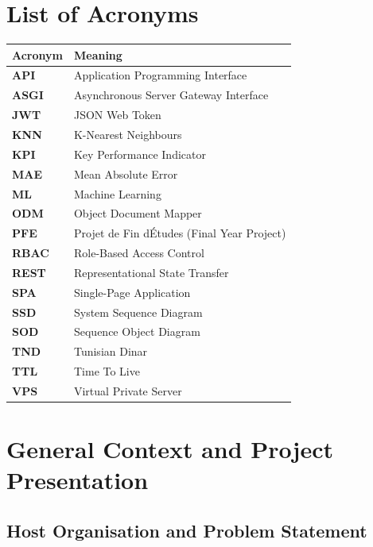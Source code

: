 \documentclass[12pt,a4paper]{report}
\begin{document}
\chapter*{List of Acronyms}\thispagestyle{plain}
\begin{longtable}{>{\bfseries}p{3cm} p{10.5cm}}
  \toprule Acronym & Meaning\\\midrule\endhead
  API   & Application Programming Interface\\
  ASGI  & Asynchronous Server Gateway Interface\\
  JWT   & JSON Web Token\\
  KNN   & K-Nearest Neighbours\\
  KPI   & Key Performance Indicator\\
  MAE   & Mean Absolute Error\\
  ML    & Machine Learning\\
  ODM   & Object Document Mapper\\
  PFE   & Projet de Fin d\'Etudes (Final Year Project)\\
  RBAC  & Role-Based Access Control\\
  REST  & Representational State Transfer\\
  SPA   & Single-Page Application\\
  SSD   & System Sequence Diagram\\
  SOD   & Sequence Object Diagram\\
  TND   & Tunisian Dinar\\
  TTL   & Time To Live\\
  VPS   & Virtual Private Server\\
  \bottomrule
\end{longtable}

\cleardoublepage{}\setcounter{page}{1}

\chapter{General Context and Project Presentation}

\section{Host Organisation and Problem Statement}
\end{document}
